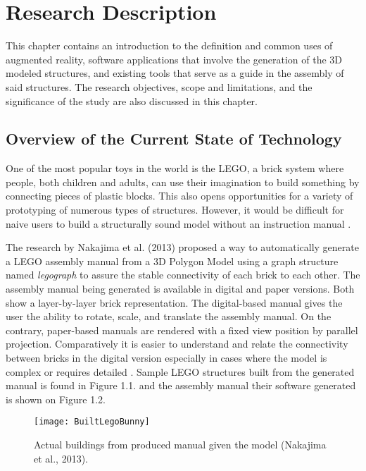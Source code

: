 \chapter{Research Description}
\label{sec:researchdesc}    %

This chapter contains an introduction to the definition and common uses of augmented reality, software applications that involve the generation of the 3D modeled structures, and existing tools that serve as a guide in the assembly of said structures. The research objectives, scope and limitations, and the significance of the study are also discussed in this chapter.

\section{Overview of the Current State of Technology}
\label{sec:overview}
One of the most popular toys in the world is the LEGO, a brick system where people, both children and adults, can use their imagination to build something by connecting pieces of plastic blocks. This also opens opportunities for a variety of prototyping of numerous types of structures. However, it would be difficult for naive users to build a structurally sound model without an instruction manual \cite{nakajima668164}.

The research by Nakajima et al. (2013) proposed a way to automatically generate a LEGO assembly manual from a 3D Polygon Model using a graph structure named {\it legograph} to assure the stable connectivity of each brick to each other. The assembly manual being generated is available in digital and paper versions. Both show a layer-by-layer brick representation. The digital-based manual gives the user the ability to rotate, scale, and translate the assembly manual. On the contrary, paper-based manuals are rendered with a fixed view position by parallel projection. Comparatively it is easier to understand and relate the connectivity between bricks in the digital version especially in cases where the model is complex or requires detailed \cite{Tseng:2012:BEM:2307096.2307119}. Sample LEGO structures built from the generated manual is found in Figure 1.1. and the assembly manual their software generated is shown on Figure 1.2.
   
\begin{figure}[h!]
  \centering
  \texttt{[image: BuiltLegoBunny]}
  \caption{Actual buildings from produced manual given the model (Nakajima et al., 2013).}
\end{figure}

